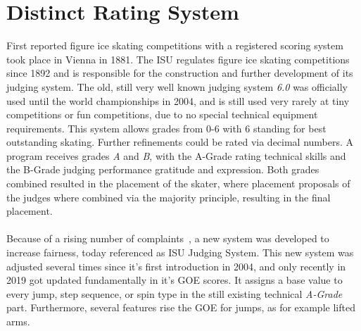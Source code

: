%


\section{Distinct Rating System}
First reported figure ice skating competitions with a registered scoring system took place in Vienna in 1881.
The \gls{ISU} regulates figure ice skating competitions since 1892 and is responsible for the
construction
and further development of its judging system.
The old, still very well known judging system \textit{6.0} was officially used until the world championships in 2004,
and
is still used very rarely at tiny competitions or fun competitions, due to no special technical equipment requirements.
This system allows grades from 0-6 with 6 standing for best outstanding skating.
Further refinements could be rated via decimal numbers.
A program receives grades \textit{A} and \textit{B}, with the A-Grade rating technical skills and the B-Grade judging
performance gratitude and expression.
Both grades combined resulted in the placement of the skater, where placement proposals of the judges where combined via
the majority principle, resulting in the final placement.
\\\mbox{}\\
Because of a rising number of complaints~\cite{unfairjudge}, a new system was developed to increase fairness, today
referenced as ISU
Judging System.
This new system was adjusted several times since it's first introduction in 2004, and only recently in 2019 got updated
fundamentally in it's \gls{GOE} scores.
It assigns a base value to every jump, step sequence, or spin type in the still existing technical \textit{A-Grade}
part.
Furthermore, several features rise the \gls{GOE} for jumps, as for example lifted arms.
